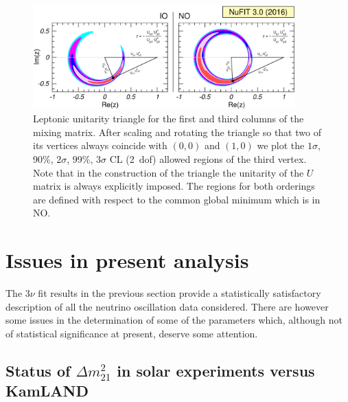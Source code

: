 \documentclass[a4paper, 11pt]{article}
\newcommand{\Dmq}{\Delta m^2}
\begin{document}
\begin{figure}\centering
\includegraphics[width=0.9\textwidth]{fig-region-viola}
  \caption{Leptonic unitarity triangle for the first and third columns
    of the mixing matrix.  After scaling and rotating the triangle so
    that two of its vertices always coincide with $(0,0)$ and $(1,0)$
    we plot the $1\sigma$, 90\%, $2\sigma$, 99\%, $3\sigma$ CL (2~dof)
    allowed regions of the third vertex. Note that in the construction
    of the triangle the unitarity of the $U$ matrix is always
    explicitly imposed. The regions for both orderings are defined
    with respect to the common global minimum which is in NO.}
  \label{fig:region-viola}
\end{figure}

\section{Issues in present analysis}
\label{sec:issues}

The $3\nu$ fit results in the previous section provide a statistically
satisfactory description of all the neutrino oscillation data
considered.  There are however some issues in the determination of
some of the parameters which, although not of statistical significance
at present, deserve some attention.

\subsection{Status of $\Dmq_{21}$ in solar experiments versus KamLAND}
\label{subsec:dm12}
\end{document}
